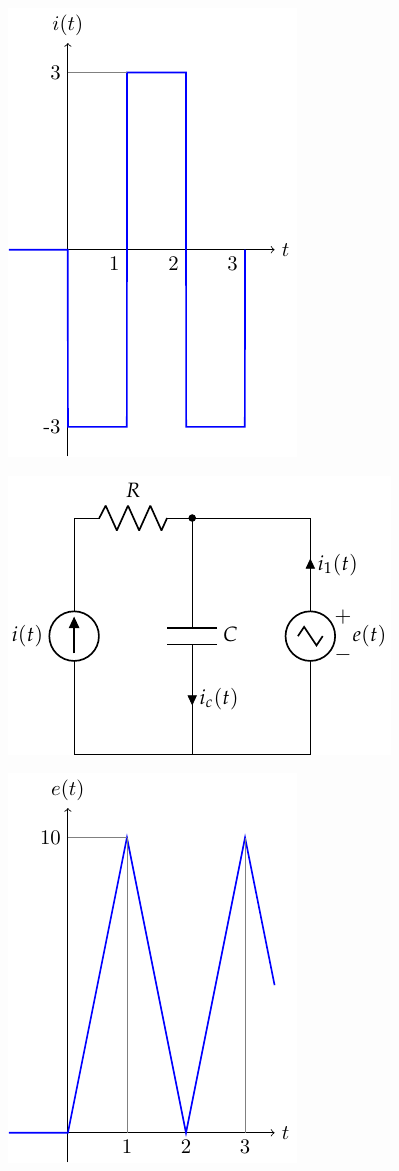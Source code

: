 \documentclass[10pt]{article}
\begin{document}
\begin{minipage}[c]{0.3\linewidth}
  \includegraphics{../figs/tren_pulsos.pdf}
\end{minipage}
\begin{minipage}[c]{0.4\linewidth}
  \includegraphics{../figs/formas_onda1.pdf}
\end{minipage}
\begin{minipage}[c]{0.3\linewidth}
  \includegraphics{../figs/onda_triangular.pdf}
\end{minipage}
\end{document}
